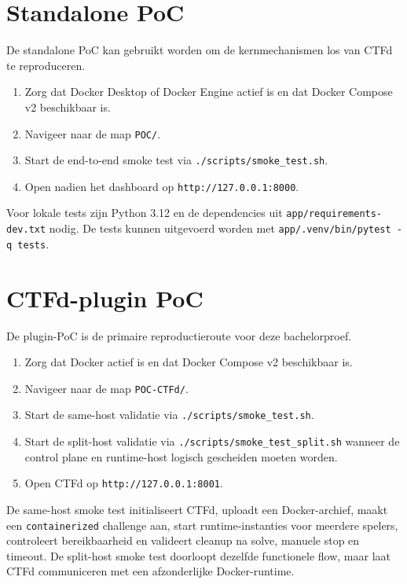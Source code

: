 \documentclass[dutch,dit,thesis]{hogentreport}
\begin{document}
\section*{Standalone PoC}

De standalone PoC kan gebruikt worden om de kernmechanismen los van CTFd te reproduceren.

\begin{enumerate}
  \item Zorg dat Docker Desktop of Docker Engine actief is en dat Docker Compose v2 beschikbaar is.
  \item Navigeer naar de map \texttt{POC/}.
  \item Start de end-to-end smoke test via \texttt{./scripts/smoke\_test.sh}.
  \item Open nadien het dashboard op \texttt{http://127.0.0.1:8000}.
\end{enumerate}

Voor lokale tests zijn Python 3.12 en de dependencies uit \texttt{app/requirements-dev.txt} nodig. De tests kunnen uitgevoerd worden met \texttt{app/.venv/bin/pytest -q tests}.

\section*{CTFd-plugin PoC}

De plugin-PoC is de primaire reproductieroute voor deze bachelorproef.

\begin{enumerate}
  \item Zorg dat Docker actief is en dat Docker Compose v2 beschikbaar is.
  \item Navigeer naar de map \texttt{POC-CTFd/}.
  \item Start de same-host validatie via \texttt{./scripts/smoke\_test.sh}.
  \item Start de split-host validatie via \texttt{./scripts/smoke\_test\_split.sh} wanneer de control plane en runtime-host logisch gescheiden moeten worden.
  \item Open CTFd op \texttt{http://127.0.0.1:8001}.
\end{enumerate}

De same-host smoke test initialiseert CTFd, uploadt een Docker-archief, maakt een \texttt{containerized} challenge aan, start runtime-instanties voor meerdere spelers, controleert bereikbaarheid en valideert cleanup na solve, manuele stop en timeout. De split-host smoke test doorloopt dezelfde functionele flow, maar laat CTFd communiceren met een afzonderlijke Docker-runtime.
\end{document}
